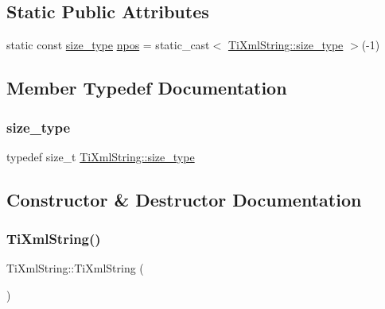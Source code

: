 \subsection*{Static Public Attributes}
\begin{DoxyCompactItemize}
\item 
static const \hyperlink{class_ti_xml_string_abeb2c1893a04c17904f7c06546d0b971}{size\+\_\+type} \hyperlink{class_ti_xml_string_a8f4422d227088dc7bec96f479b275d0a}{npos} = static\+\_\+cast$<$ \hyperlink{class_ti_xml_string_abeb2c1893a04c17904f7c06546d0b971}{Ti\+Xml\+String\+::size\+\_\+type} $>$(-\/1)
\end{DoxyCompactItemize}


\subsection{Member Typedef Documentation}
\mbox{\label{class_ti_xml_string_abeb2c1893a04c17904f7c06546d0b971}} 
\subsubsection{\texorpdfstring{size\+\_\+type}{size\_type}}
{\footnotesize\ttfamily typedef size\+\_\+t \hyperlink{class_ti_xml_string_abeb2c1893a04c17904f7c06546d0b971}{Ti\+Xml\+String\+::size\+\_\+type}}



\subsection{Constructor \& Destructor Documentation}
\mbox{\label{class_ti_xml_string_a342f61e0fc2244df300b73aedf6d3fef}} 
\subsubsection{\texorpdfstring{Ti\+Xml\+String()}{TiXmlString()}\hspace{0.1cm}{\footnotesize\ttfamily [1/4]}}
{\footnotesize\ttfamily Ti\+Xml\+String\+::\+Ti\+Xml\+String (\begin{DoxyParamCaption}{ }\end{DoxyParamCaption})\hspace{0.3cm}{\ttfamily [inline]}}

